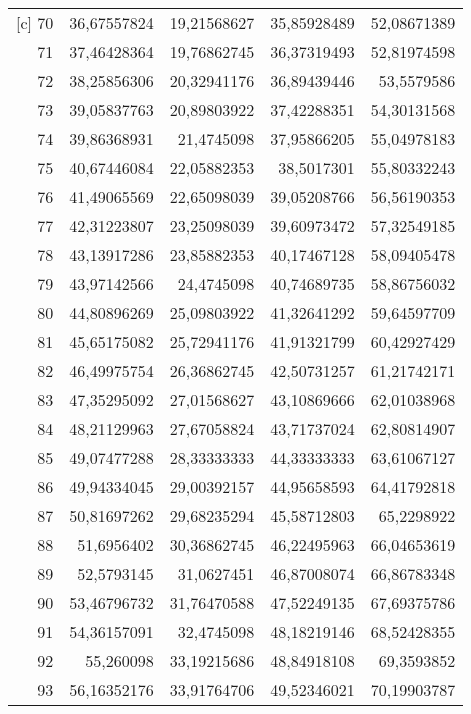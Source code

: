 \begin{longtable}{r|rrrr}[c]
    70    & 36,67557824 & 19,21568627 & 35,85928489 & 52,08671389 \\
    71    & 37,46428364 & 19,76862745 & 36,37319493 & 52,81974598 \\
    72    & 38,25856306 & 20,32941176 & 36,89439446 & 53,5579586 \\
    73    & 39,05837763 & 20,89803922 & 37,42288351 & 54,30131568 \\
    74    & 39,86368931 & 21,4745098 & 37,95866205 & 55,04978183 \\
    75    & 40,67446084 & 22,05882353 & 38,5017301 & 55,80332243 \\
    76    & 41,49065569 & 22,65098039 & 39,05208766 & 56,56190353 \\
    77    & 42,31223807 & 23,25098039 & 39,60973472 & 57,32549185 \\
    78    & 43,13917286 & 23,85882353 & 40,17467128 & 58,09405478 \\
    79    & 43,97142566 & 24,4745098 & 40,74689735 & 58,86756032 \\
    80    & 44,80896269 & 25,09803922 & 41,32641292 & 59,64597709 \\
    81    & 45,65175082 & 25,72941176 & 41,91321799 & 60,42927429 \\
    82    & 46,49975754 & 26,36862745 & 42,50731257 & 61,21742171 \\
    83    & 47,35295092 & 27,01568627 & 43,10869666 & 62,01038968 \\
    84    & 48,21129963 & 27,67058824 & 43,71737024 & 62,80814907 \\
    85    & 49,07477288 & 28,33333333 & 44,33333333 & 63,61067127 \\
    86    & 49,94334045 & 29,00392157 & 44,95658593 & 64,41792818 \\
    87    & 50,81697262 & 29,68235294 & 45,58712803 & 65,2298922 \\
    88    & 51,6956402 & 30,36862745 & 46,22495963 & 66,04653619 \\
    89    & 52,5793145 & 31,0627451 & 46,87008074 & 66,86783348 \\
    90    & 53,46796732 & 31,76470588 & 47,52249135 & 67,69375786 \\
    91    & 54,36157091 & 32,4745098 & 48,18219146 & 68,52428355 \\
    92    & 55,260098 & 33,19215686 & 48,84918108 & 69,3593852 \\
    93    & 56,16352176 & 33,91764706 & 49,52346021 & 70,19903787 \\

\end{longtable}
